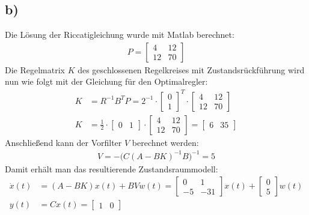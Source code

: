 \documentclass[11pt]{scrartcl} %
\begin{document}
\subsection*{b)}
Die Lösung der Riccatigleichung wurde mit Matlab berechnet:
\begin{align*}
	P=\begin{bmatrix}4&12\\12&70\end{bmatrix}
\end{align*}
Die Regelmatrix $K$ des geschlossenen Regelkreises mit Zustandsrückführung wird nun wie folgt mit der Gleichung für den Optimalregler:
\begin{align*}
	K&=R^{-1}B^TP=2^{-1}\cdot\begin{bmatrix}0\\1\end{bmatrix}^T\cdot\begin{bmatrix}4&12\\12&70\end{bmatrix}\\
	K&=\frac{1}{2}\cdot\begin{bmatrix}0&1\end{bmatrix}\cdot\begin{bmatrix}4&12\\12&70\end{bmatrix}=\begin{bmatrix}6&35\end{bmatrix}
\end{align*}
Anschließend kann der Vorfilter $V$ berechnet werden:
\begin{align*}
	V=-\bigl(C(A-BK)^{-1}B\bigr)^{-1}=5
\end{align*}
Damit erhält man das resultierende Zustandsraummodell:
\begin{align*}
	\dot{x}(t)&=(A-BK)x(t)+BVw(t)=\begin{bmatrix}0&1\\-5&-31\end{bmatrix}x(t)+\begin{bmatrix}0\\5\end{bmatrix}w(t)\\
	y(t)&=Cx(t)=\begin{bmatrix}1&0\end{bmatrix}
\end{align*}
\end{document}
